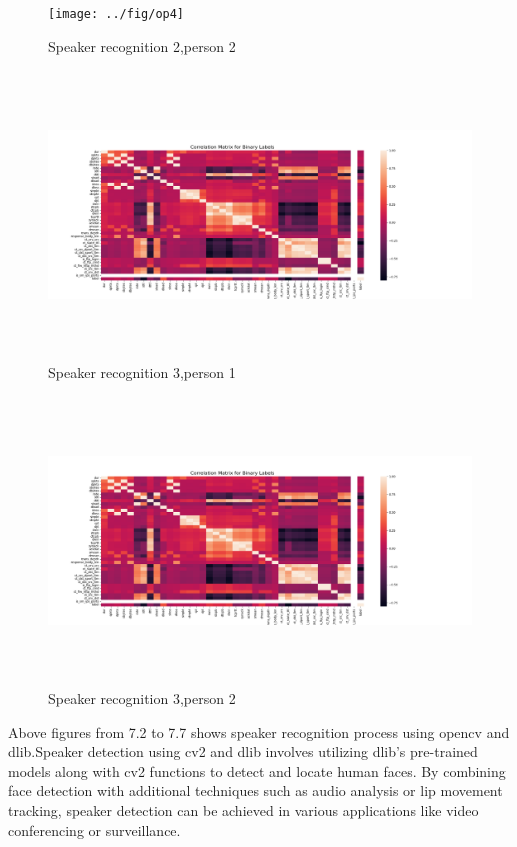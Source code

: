 \documentclass[12pt,a4paper]{report}
\begin{document}
\begin{figure} [hbtp]
\centering
\texttt{[image: ../fig/op4]}
\caption{Speaker recognition 2,person 2}
\end{figure}

\begin{figure} [hbtp]
\centering
\includegraphics[width=5in,height=3in]{pic/correlation_matrix_bin.png}
\caption{Speaker recognition 3,person 1}
\end{figure}

\begin{figure} [hbtp]
\centering
\includegraphics[width=5in,height=3in]{pic/correlation_matrix_bin.png}
\caption{Speaker recognition 3,person 2}
\end{figure}
\newpage
\par Above figures from 7.2 to 7.7 shows speaker recognition process using opencv and dlib.Speaker detection using cv2 and dlib involves utilizing dlib's pre-trained models along with cv2 functions to detect and locate human faces. By combining face detection with additional techniques such as audio analysis or lip movement tracking, speaker detection can be achieved in various applications like video conferencing or surveillance.
\end{document}
